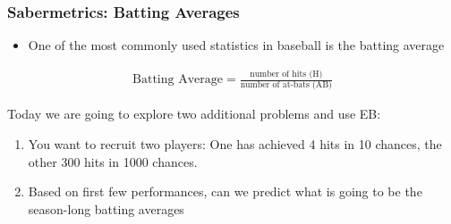 \documentclass[
  shownotes,
  xcolor={svgnames},
  hyperref={colorlinks,citecolor=DarkBlue,linkcolor=DarkRed,urlcolor=DarkBlue}
  , aspectratio=169]{beamer}
\begin{document}
\begin{frame}[fragile]
\frametitle{Sabermetrics: Batting Averages}
\begin{itemize}
\item One of the most commonly used statistics in baseball is the batting average
\end{itemize}

\begin{align}
\text{Batting Average} = \frac{\text{number of hits (H)}}{\text{number of at-bats (AB)}}
\end{align}

\bigskip
Today we are going to explore two additional problems  and use EB:
\medskip
\begin{enumerate}
\item You want to recruit two players:  One has achieved 4 hits in 10 chances, the other 300 hits in 1000 chances.
\item Based on first few performances, can we predict what is going to be the season-long batting averages
\end{enumerate}


\end{frame}
\end{document}
